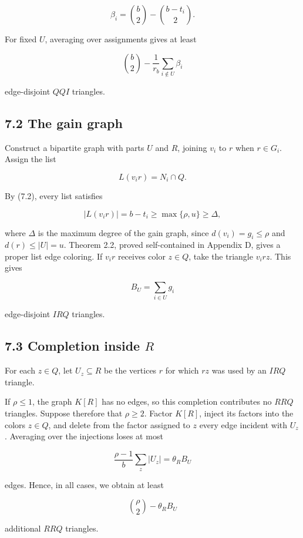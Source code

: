 \documentclass[
  11pt,
]{article}
\begin{document}
\[
\beta_i
=
\binom b2-\binom{b-t_i}{2}.
\tag{7.4}
\]

For fixed \(U\), averaging over assignments gives at least

\[
\binom b2-\frac1{r_b}\sum_{i\notin U}\beta_i
\tag{7.5}
\]

edge-disjoint \(QQI\) triangles.

\subsection{7.2 The gain graph}\label{the-gain-graph}

Construct a bipartite graph with parts \(U\) and \(R\), joining \(v_i\) to \(r\) when \(r\in G_i\). Assign the list

\[
L(v_ir)=N_i\cap Q.
\]

By (7.2), every list satisfies

\[
|L(v_ir)|=b-t_i
\ge
\max\{\rho,u\}
\ge
\Delta,
\]

where \(\Delta\) is the maximum degree of the gain graph, since \(d(v_i)=g_i\le\rho\) and \(d(r)\le|U|=u\). Theorem 2.2, proved self-contained in Appendix D, gives a proper list edge coloring. If \(v_ir\) receives color \(z\in Q\), take the triangle \(v_irz\). This gives

\[
B_U=\sum_{i\in U}g_i
\]

edge-disjoint \(IRQ\) triangles.

\subsection{\texorpdfstring{7.3 Completion inside \(R\)}{7.3 Completion inside R}}\label{completion-inside-r}

For each \(z\in Q\), let \(U_z\subseteq R\) be the vertices \(r\) for which \(rz\) was used by an \(IRQ\) triangle.

If \(\rho\le1\), the graph \(K[R]\) has no edges, so this completion contributes no \(RRQ\) triangles. Suppose therefore that \(\rho\ge2\). Factor \(K[R]\), inject its factors into the colors \(z\in Q\), and delete from the factor assigned to \(z\) every edge incident with \(U_z\). Averaging over the injections loses at most

\[
\frac{\rho-1}{b}\sum_z|U_z|
=
\theta_RB_U
\]

edges. Hence, in all cases, we obtain at least

\[
\binom\rho2-\theta_RB_U
\]

additional \(RRQ\) triangles.
\end{document}
